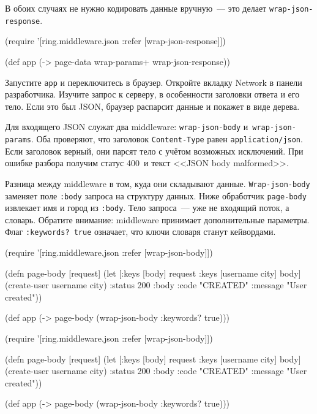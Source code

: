 \fi

\noindent
В обоих случаях не нужно кодировать данные вручную~--- это делает
\verb|wrap-json-response|.

\begin{english}
  \begin{clojure}
(require '[ring.middleware.json
           :refer [wrap-json-response]])

(def app (-> page-data
             wrap-params+
             wrap-json-response))
  \end{clojure}
\end{english}

Запустите \verb|app| и переключитесь в браузер. Откройте вкладку Network в
панели разработчика. Изучите запрос к серверу, в особенности заголовки ответа и
его тело. Если это был JSON, браузер распарсит данные и покажет в виде дерева.

Для входящего JSON служат два middleware: \verb|wrap-json-body|
и~\verb|wrap-json-params|. Оба проверяют, что заголовок \verb|Content-Type|
равен \verb|application/json|. Если заголовок верный, они парсят тело с учётом
возможных исключений. При ошибке разбора получим статус 400~и текст <<JSON body
malformed>>.

Разница между middleware в том, куда они складывают
данные. \verb|Wrap-json-body| заменяет поле \verb|:body| запроса на
структуру данных. Ниже обработчик \verb|page-body| извлекает имя и город из
\verb|:body|. Тело запроса~--- уже не входящий поток, а словарь. Обратите
внимание: middleware принимает дополнительные параметры. Флаг \verb|:keywords? true|
означает, что ключи словаря станут кейвордами.

\ifnarrow

\begin{english}
  \begin{clojure}
(require '[ring.middleware.json
           :refer [wrap-json-body]])

(defn page-body [request]
  (let [{:keys [body]} request
        {:keys [username city]} body]
    (create-user username city)
    {:status 200
     :body {:code "CREATED"
            :message "User created"}}))

(def app
  (->
    page-body
    (wrap-json-body {:keywords? true})))
  \end{clojure}
\end{english}

\else

\begin{english}
  \begin{clojure}
(require '[ring.middleware.json
           :refer [wrap-json-body]])

(defn page-body [request]
  (let [{:keys [body]} request
        {:keys [username city]} body]
    (create-user username city)
    {:status 200
     :body {:code "CREATED"
            :message "User created"}}))

(def app (-> page-body
             (wrap-json-body {:keywords? true})))
  \end{clojure}
\end{english}


